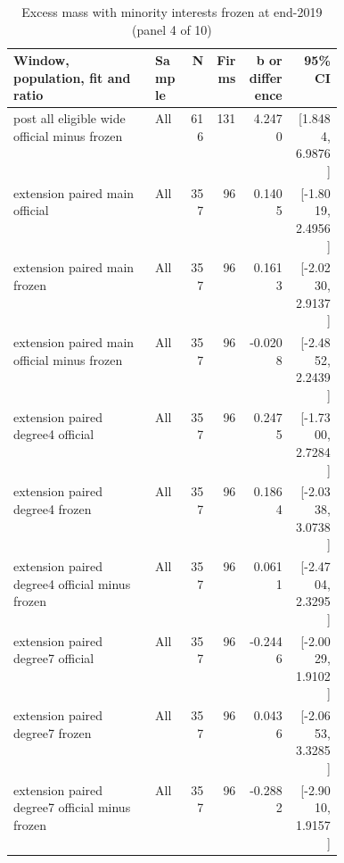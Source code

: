 \begin{table}[!htbp]\centering\scriptsize
\caption{Excess mass with minority interests frozen at end-2019 (panel 4 of 10)}
\begin{threeparttable}
\begin{tabular}{p{0.43\linewidth}lrrrr}
\toprule
Window, population, fit and ratio & Sample & N & Firms & b or difference & 95\% CI \\
\midrule
post all eligible wide official minus frozen & All & 616 & 131 & 4.2470 & [1.8484, 6.9876] \\
extension paired main official & All & 357 & 96 & 0.1405 & [-1.8019, 2.4956] \\
extension paired main frozen & All & 357 & 96 & 0.1613 & [-2.0230, 2.9137] \\
extension paired main official minus frozen & All & 357 & 96 & -0.0208 & [-2.4852, 2.2439] \\
extension paired degree4 official & All & 357 & 96 & 0.2475 & [-1.7300, 2.7284] \\
extension paired degree4 frozen & All & 357 & 96 & 0.1864 & [-2.0338, 3.0738] \\
extension paired degree4 official minus frozen & All & 357 & 96 & 0.0611 & [-2.4704, 2.3295] \\
extension paired degree7 official & All & 357 & 96 & -0.2446 & [-2.0029, 1.9102] \\
extension paired degree7 frozen & All & 357 & 96 & 0.0436 & [-2.0653, 3.3285] \\
extension paired degree7 official minus frozen & All & 357 & 96 & -0.2882 & [-2.9010, 1.9157] \\
\bottomrule
\end{tabular}
\begin{tablenotes}[flushleft]\footnotesize

\end{tablenotes}
\end{threeparttable}
\end{table}
